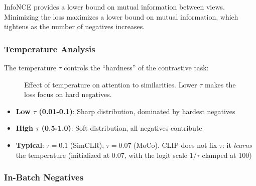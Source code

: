 InfoNCE provides a lower bound on mutual information between views. Minimizing the loss maximizes a lower bound on mutual information, which tightens as the number of negatives increases.

\subsubsection{Temperature Analysis}

The temperature $\tau$ controls the ``hardness'' of the contrastive task:

\begin{figure}[H]
\centering
{}
\caption{Effect of temperature on attention to similarities. Lower $\tau$ makes the loss focus on hard negatives.}
\end{figure}

\begin{itemize}
    \item \textbf{Low $\tau$ (0.01-0.1)}: Sharp distribution, dominated by hardest negatives
    \item \textbf{High $\tau$ (0.5-1.0)}: Soft distribution, all negatives contribute
    \item \textbf{Typical}: $\tau = 0.1$ (SimCLR), $\tau = 0.07$ (MoCo). CLIP does not fix $\tau$: it \textit{learns} the temperature (initialized at $0.07$, with the logit scale $1/\tau$ clamped at 100)
\end{itemize}

\subsubsection{In-Batch Negatives}

